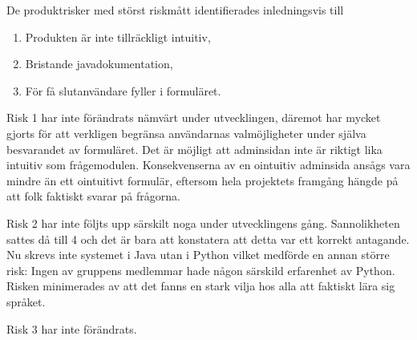 \documentclass[12pt]{article}
\begin{document}
De produktrisker med störst riskmått identifierades inledningsvis till 

\begin{enumerate}
    \item Produkten är inte tillräckligt intuitiv,
    \item Bristande javadokumentation,
    \item För få slutanvändare fyller i formuläret.
\end{enumerate}

Risk 1 har inte förändrats nämvärt under utvecklingen, däremot har mycket gjorts för att verkligen begränsa användarnas valmöjligheter under själva besvarandet av formuläret. Det är möjligt att adminsidan inte är riktigt lika intuitiv som frågemodulen. Konsekvenserna av en ointuitiv adminsida ansågs vara mindre än ett ointuitivt formulär, eftersom hela projektets framgång hängde på att folk faktiskt svarar på frågorna. 

Risk 2 har inte följts upp särskilt noga under utvecklingens gång. Sannolikheten sattes då till 4 och det är bara att konstatera att detta var ett korrekt antagande. Nu skrevs inte systemet i Java utan i Python vilket medförde en annan större risk: Ingen av gruppens medlemmar hade någon särskild erfarenhet av Python. Risken minimerades av att det fanns en stark vilja hos alla att faktiskt lära sig språket.

Risk 3 har inte förändrats. 


\end{document}
